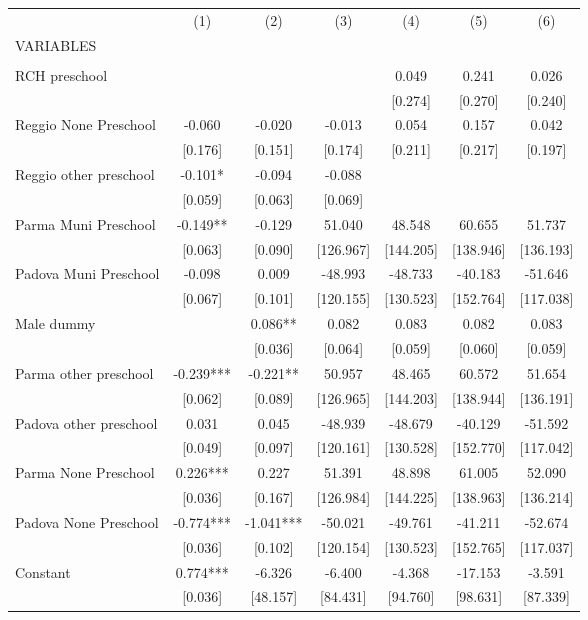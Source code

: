 \begin{tabular}{lcccccc} \hline
 & (1) & (2) & (3) & (4) & (5) & (6) \\
VARIABLES &  &  &  &  &  &  \\ \hline
 &  &  &  &  &  &  \\
RCH preschool &  &  &  & 0.049 & 0.241 & 0.026 \\
 &  &  &  & [0.274] & [0.270] & [0.240] \\
Reggio None Preschool & -0.060 & -0.020 & -0.013 & 0.054 & 0.157 & 0.042 \\
 & [0.176] & [0.151] & [0.174] & [0.211] & [0.217] & [0.197] \\
Reggio other preschool & -0.101* & -0.094 & -0.088 &  &  &  \\
 & [0.059] & [0.063] & [0.069] &  &  &  \\
Parma Muni Preschool & -0.149** & -0.129 & 51.040 & 48.548 & 60.655 & 51.737 \\
 & [0.063] & [0.090] & [126.967] & [144.205] & [138.946] & [136.193] \\
Padova Muni Preschool & -0.098 & 0.009 & -48.993 & -48.733 & -40.183 & -51.646 \\
 & [0.067] & [0.101] & [120.155] & [130.523] & [152.764] & [117.038] \\
Male dummy &  & 0.086** & 0.082 & 0.083 & 0.082 & 0.083 \\
 &  & [0.036] & [0.064] & [0.059] & [0.060] & [0.059] \\
Parma other preschool & -0.239*** & -0.221** & 50.957 & 48.465 & 60.572 & 51.654 \\
 & [0.062] & [0.089] & [126.965] & [144.203] & [138.944] & [136.191] \\
Padova other preschool & 0.031 & 0.045 & -48.939 & -48.679 & -40.129 & -51.592 \\
 & [0.049] & [0.097] & [120.161] & [130.528] & [152.770] & [117.042] \\
Parma None Preschool & 0.226*** & 0.227 & 51.391 & 48.898 & 61.005 & 52.090 \\
 & [0.036] & [0.167] & [126.984] & [144.225] & [138.963] & [136.214] \\
Padova None Preschool & -0.774*** & -1.041*** & -50.021 & -49.761 & -41.211 & -52.674 \\
 & [0.036] & [0.102] & [120.154] & [130.523] & [152.765] & [117.037] \\
Constant & 0.774*** & -6.326 & -6.400 & -4.368 & -17.153 & -3.591 \\
 & [0.036] & [48.157] & [84.431] & [94.760] & [98.631] & [87.339] \\

\end{tabular}
